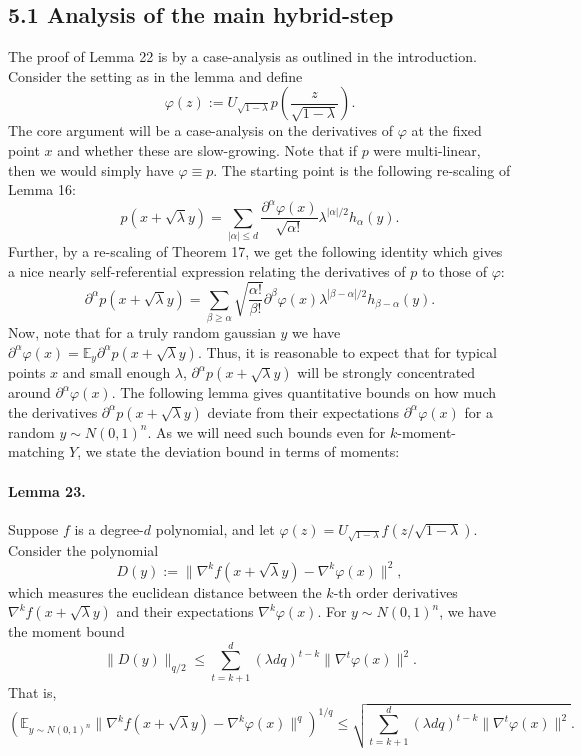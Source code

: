 \documentclass[10pt,a4paper]{article}
\begin{document}
\subsection*{5.1 Analysis of the main hybrid-step}
The proof of Lemma 22 is by a case-analysis as outlined in the introduction. Consider the setting as in the lemma and define
\[\varphi(z):=U_{\sqrt{1-\lambda}}p\left(\frac z{\sqrt{1-\lambda}}\right).\]
The core argument will be a case-analysis on the derivatives of $\varphi$ at the fixed point $x$ and whether these are slow-growing. Note that if $p$ were multi-linear, then we would simply have $\varphi\equiv p$. The starting point is the following re-scaling of Lemma 16:
\[p(x+\sqrt\lambda y)=\sum_{|\alpha|\leq d}\frac{\partial^\alpha\varphi(x)}{\sqrt{\alpha!}}\lambda^{|\alpha|/2}h_\alpha(y).\tag{4}\]
Further, by a re-scaling of Theorem 17, we get the following identity which gives a nice nearly self-referential expression relating the derivatives of $p$ to those of $\varphi$:
\[\partial^\alpha p(x+\sqrt\lambda y)=\sum_{\beta\geq\alpha}\sqrt{\frac{\alpha!}{\beta!}}\partial^\beta\varphi(x)\lambda^{|\beta-\alpha|/2}h_{\beta-\alpha}(y).\tag{5}\]
Now, note that for a truly random gaussian $y$ we have $\partial^\alpha\varphi(x)=\mathbb E_y\partial^\alpha p(x+\sqrt\lambda y)$. Thus, it is reasonable to expect that for typical points $x$ and small enough $\lambda$, $\partial^\alpha p(x+\sqrt\lambda y)$ will be strongly concentrated around $\partial^\alpha\varphi(x)$. The following lemma gives quantitative bounds on how much the derivatives $\partial^\alpha p(x+\sqrt\lambda y)$ deviate from their expectations $\partial^\alpha\varphi(x)$ for a random $y\sim N(0,1)^n$. As we will need such bounds even for $k$-moment-matching $Y$, we state the deviation bound in terms of moments:
\paragraph{Lemma 23.} Suppose $f$ is a degree-$d$ polynomial, and let $\varphi(z)=U_{\sqrt{1-\lambda}}f(z/\sqrt{1-\lambda})$. Consider the polynomial
\[D(y):=\|\nabla^kf(x+\sqrt\lambda y)-\nabla^k\varphi(x)\|^2,\]
which measures the euclidean distance between the $k$-th order derivatives $\nabla^kf(x+\sqrt\lambda y)$ and their expectations $\nabla^k\varphi(x)$. For $y\sim N(0,1)^n$, we have the moment bound
\[\|D(y)\|_{q/2}\leq\sum_{t=k+1}^d(\lambda dq)^{t-k}\|\nabla^t\varphi(x)\|^2.\]
That is,
\[\left(\mathbb E_{y\sim N(0,1)^n}\|\nabla^kf(x+\sqrt\lambda y)-\nabla^k\varphi(x)\|^q\right)^{1/q}\leq\sqrt{\sum_{t=k+1}^d(\lambda dq)^{t-k}\|\nabla^t\varphi(x)\|^2}.\]
\end{document}
